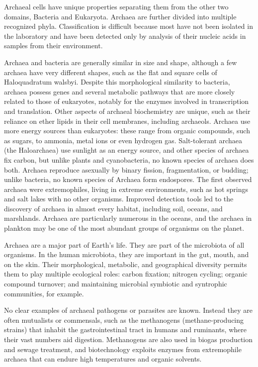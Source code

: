 Archaeal cells have unique properties separating them from the other two domains, Bacteria and Eukaryota. Archaea are further divided into multiple recognized phyla. Classification is difficult because most have not been isolated in the laboratory and have been detected only by analysis of their nucleic acids in samples from their environment.

Archaea and bacteria are generally similar in size and shape, although a few archaea have very different shapes, such as the flat and square cells of Haloquadratum walsbyi. Despite this morphological similarity to bacteria, archaea possess genes and several metabolic pathways that are more closely related to those of eukaryotes, notably for the enzymes involved in transcription and translation. Other aspects of archaeal biochemistry are unique, such as their reliance on ether lipids in their cell membranes, including archaeols. Archaea use more energy sources than eukaryotes: these range from organic compounds, such as sugars, to ammonia, metal ions or even hydrogen gas. Salt-tolerant archaea (the Haloarchaea) use sunlight as an energy source, and other species of archaea fix carbon, but unlike plants and cyanobacteria, no known species of archaea does both. Archaea reproduce asexually by binary fission, fragmentation, or budding; unlike bacteria, no known species of Archaea form endospores. The first observed archaea were extremophiles, living in extreme environments, such as hot springs and salt lakes with no other organisms. Improved detection tools led to the discovery of archaea in almost every habitat, including soil, oceans, and marshlands. Archaea are particularly numerous in the oceans, and the archaea in plankton may be one of the most abundant groups of organisms on the planet.

Archaea are a major part of Earth's life. They are part of the microbiota of all organisms. In the human microbiota, they are important in the gut, mouth, and on the skin. Their morphological, metabolic, and geographical diversity permits them to play multiple ecological roles: carbon fixation; nitrogen cycling; organic compound turnover; and maintaining microbial symbiotic and syntrophic communities, for example.

No clear examples of archaeal pathogens or parasites are known. Instead they are often mutualists or commensals, such as the methanogens (methane-producing strains) that inhabit the gastrointestinal tract in humans and ruminants, where their vast numbers aid digestion. Methanogens are also used in biogas production and sewage treatment, and biotechnology exploits enzymes from extremophile archaea that can endure high temperatures and organic solvents.

